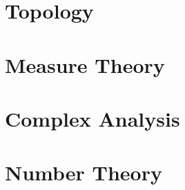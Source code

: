 \documentclass[11pt,a4paper]{colorart}
\numberwithin{equation}{section}
\begin{document}
\part{Topology}



\newpage
\part{Measure Theory}






\newpage
\part{Complex Analysis}


\newpage
\part{Number Theory}




\end{document}
